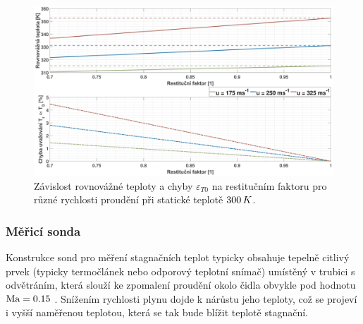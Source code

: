             \begin{figure}[ht!]
                \centering
                \includegraphics*[width=\textwidth, trim = {6cm 0cm 6cm 0cm}]{100_MERENI_TEPLOT/chyba_Tr_T0.eps}
                \caption{Závislost rovnovážné teploty a chyby $\varepsilon _{T0}$ na restitučním faktoru pro různé rychlosti proudění při statické teplotě $300 \, K$.}
                \label{fig:chyba-Tr-T0}
            \end{figure}

        \subsubsection{Měřicí sonda}
            Konstrukce sond pro měření stagnačních teplot typicky obsahuje tepelně citlivý prvek (typicky termočlánek nebo odporový teplotní snímač) umístěný v trubici s odvětráním, která slouží ke zpomalení proudění okolo čidla obvykle pod hodnotu $\textrm{Ma} = 0.15$ \cite{Bonham2013}. Snížením rychlosti plynu dojde k nárůstu jeho teploty, což se projeví i vyšší naměřenou teplotou, která se tak bude blížit teplotě stagnační. 

